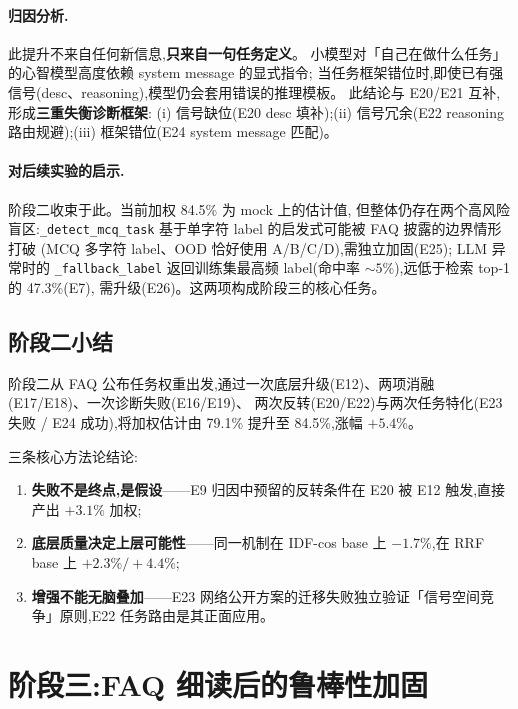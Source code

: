 \documentclass[11pt,a4paper]{ctexart}
\begin{document}
\paragraph{归因分析.}此提升不来自任何新信息,\textbf{只来自一句任务定义}。
小模型对「自己在做什么任务」的心智模型高度依赖 system message 的显式指令;
当任务框架错位时,即使已有强信号(desc、reasoning),模型仍会套用错误的推理模板。
此结论与 E20/E21 互补,形成\textbf{三重失衡诊断框架}:
(i) 信号缺位(E20 desc 填补);(ii) 信号冗余(E22 reasoning 路由规避);(iii) 框架错位(E24 system message 匹配)。

\paragraph{对后续实验的启示.}阶段二收束于此。当前加权 84.5\% 为 mock 上的估计值,
但整体仍存在两个高风险盲区:\texttt{\_detect\_mcq\_task} 基于单字符 label 的启发式可能被 FAQ 披露的边界情形打破
(MCQ 多字符 label、OOD 恰好使用 A/B/C/D),需独立加固(E25);
LLM 异常时的 \texttt{\_fallback\_label} 返回训练集最高频 label(命中率 $\sim 5\%$),远低于检索 top-1 的 47.3\%(E7),
需升级(E26)。这两项构成阶段三的核心任务。

\subsection{阶段二小结}

阶段二从 FAQ 公布任务权重出发,通过一次底层升级(E12)、两项消融(E17/E18)、一次诊断失败(E16/E19)、
两次反转(E20/E22)与两次任务特化(E23 失败 / E24 成功),将加权估计由 79.1\% 提升至 84.5\%,涨幅 $+5.4\%$。

\noindent 三条核心方法论结论:
\begin{enumerate}[leftmargin=2em,itemsep=0.1em]
\item \textbf{失败不是终点,是假设}——E9 归因中预留的反转条件在 E20 被 E12 触发,直接产出 $+3.1\%$ 加权;
\item \textbf{底层质量决定上层可能性}——同一机制在 IDF-cos base 上 $-1.7\%$,在 RRF base 上 $+2.3\%/+4.4\%$;
\item \textbf{增强不能无脑叠加}——E23 网络公开方案的迁移失败独立验证「信号空间竞争」原则,E22 任务路由是其正面应用。
\end{enumerate}

\section{阶段三:FAQ 细读后的鲁棒性加固}\label{sec:phase3}
\end{document}
